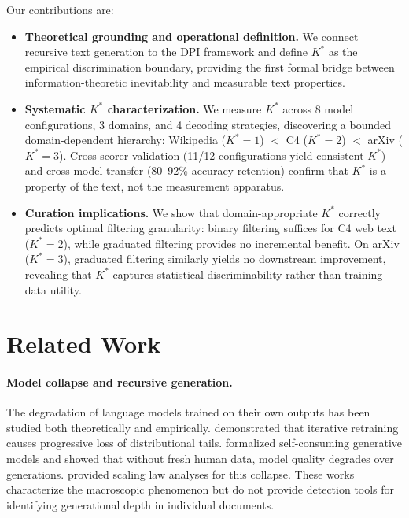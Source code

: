 \documentclass[11pt]{article}
\begin{document}
Our contributions are:
\begin{itemize}
    \item \textbf{Theoretical grounding and operational definition.} We connect recursive text generation to the DPI framework and define $K^*$ as the empirical discrimination boundary, providing the first formal bridge between information-theoretic inevitability and measurable text properties.
    \item \textbf{Systematic $K^*$ characterization.} We measure $K^*$ across 8 model configurations, 3 domains, and 4 decoding strategies, discovering a bounded domain-dependent hierarchy: Wikipedia ($K^*{=}1$) $<$ C4 ($K^*{=}2$) $<$ arXiv ($K^*{=}3$). Cross-scorer validation (11/12 configurations yield consistent $K^*$) and cross-model transfer (80--92\% accuracy retention) confirm that $K^*$ is a property of the text, not the measurement apparatus.
    \item \textbf{Curation implications.} We show that domain-appropriate $K^*$ correctly predicts optimal filtering granularity: binary filtering suffices for C4 web text ($K^*{=}2$), while graduated filtering provides no incremental benefit. On arXiv ($K^*{=}3$), graduated filtering similarly yields no downstream improvement, revealing that $K^*$ captures statistical discriminability rather than training-data utility.
\end{itemize}

\section{Related Work}

\paragraph{Model collapse and recursive generation.}
The degradation of language models trained on their own outputs has been studied both theoretically and empirically. \citet{shumailov2024ai} demonstrated that iterative retraining causes progressive loss of distributional tails. \citet{alemohammad2024selfconsuming} formalized self-consuming generative models and showed that without fresh human data, model quality degrades over generations. \citet{dohmatob2024model} provided scaling law analyses for this collapse. These works characterize the macroscopic phenomenon but do not provide detection tools for identifying generational depth in individual documents.
\end{document}
